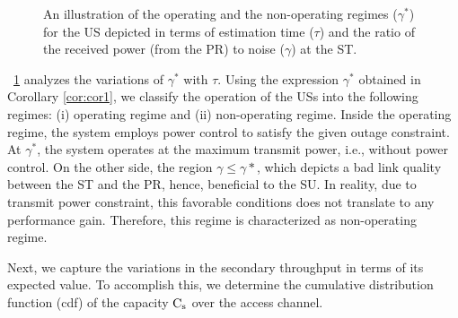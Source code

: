 \begin{figure}

\caption{An illustration of the operating and the non-operating regimes ($\gamma^*$) for the US depicted in terms of estimation time ($\tau$) and the ratio of the received power (from the PR) to noise ($\gamma$) at the ST.}
\label{fig:or}
\end{figure}
\begin{remark} \label{rm:rm1}
\normalfont
\figurename~\ref{fig:or} analyzes the variations of $\gamma^*$ with $\tau$. Using the expression $\gamma^*$ obtained in Corollary \ref{cor:cor1}, we classify the operation of the USs into the following regimes: (i) operating regime and (ii) non-operating regime. Inside the operating regime, the system employs power control to satisfy the given outage constraint. At $\gamma^*$, the system operates at the maximum transmit power, i.e., without power control. On the other side, the region $\gamma \le \gamma*$, which depicts a bad link quality between the ST and the PR, hence, beneficial to the SU. In reality, due to transmit power constraint, this favorable conditions does not translate to any performance gain. Therefore, this regime is characterized as non-operating regime. %
\end{remark}

Next, we capture the variations in the secondary throughput in terms of its expected value. To accomplish this, we determine the cumulative distribution function (cdf) of the capacity $\text{C}_{\text{s}}$ over the access channel.

